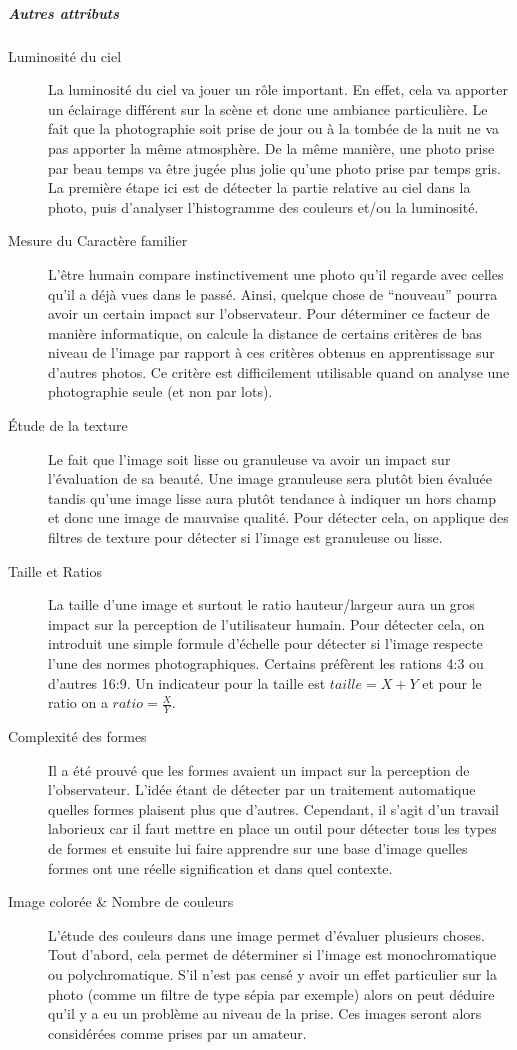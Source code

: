 \documentclass[11pt, french]{report-rd-info}
\begin{document}
\subparagraph{Autres attributs}
\begin{description}

\item[Luminosité du ciel]
La luminosité du ciel va jouer un rôle important. En effet, cela va apporter un éclairage différent sur la scène et donc une ambiance particulière. Le fait que la photographie soit prise de jour ou à la tombée de la nuit ne va pas apporter la même atmosphère. De la même manière, une photo prise par beau temps va être jugée plus jolie qu’une photo prise par temps gris. La première étape ici est de détecter la partie relative au ciel dans la photo, puis d’analyser l’histogramme des couleurs et/ou la luminosité.
\item[Mesure du Caractère familier]
L’être humain compare instinctivement une photo qu’il regarde avec celles qu’il a déjà vues dans le passé. Ainsi, quelque chose de “nouveau” pourra avoir un certain impact sur l’observateur. Pour déterminer ce facteur de manière informatique, on calcule la distance de certains critères de bas niveau de l’image par rapport à ces critères obtenus en apprentissage sur d’autres photos. Ce critère est difficilement utilisable quand on analyse une photographie seule (et non par lots).
\item[Étude de la texture]
Le fait que l’image soit lisse ou granuleuse va avoir un impact sur l’évaluation de sa beauté. Une image granuleuse sera plutôt bien évaluée tandis qu’une image lisse aura plutôt tendance à indiquer un hors champ et donc une image de mauvaise qualité. Pour détecter cela, on applique des filtres de texture pour détecter si l’image est granuleuse ou lisse.
\item[Taille et Ratios]
La taille d’une image et surtout le ratio hauteur/largeur aura un gros impact sur la perception de l’utilisateur humain. Pour détecter cela, on introduit une simple formule d’échelle pour détecter si l’image respecte l’une des normes photographiques. Certains préfèrent les rations 4:3 ou d’autres 16:9. Un indicateur pour la taille est $taille = X+Y$ et pour le ratio on a $ratio = \frac{X}{Y}$.

\item[Complexité des formes]
Il a été prouvé que les formes avaient un impact sur la perception de l’observateur. L'idée étant de détecter par un traitement automatique quelles formes plaisent plus que d’autres. Cependant, il s’agit d’un travail laborieux car il faut mettre en place un outil pour détecter tous les types de formes et ensuite lui faire apprendre sur une base d’image quelles formes ont une réelle signification et dans quel contexte.
\item[Image colorée \& Nombre de couleurs]
L’étude des couleurs dans une image permet d’évaluer plusieurs choses. Tout d’abord, cela permet de déterminer si l’image est monochromatique  ou polychromatique. S’il n’est pas censé y avoir un effet particulier sur la photo (comme un filtre de type sépia par exemple) alors on peut déduire qu’il y a eu un problème au niveau de la prise. Ces images seront alors considérées comme prises par un amateur.


\end{description}
\end{document}

